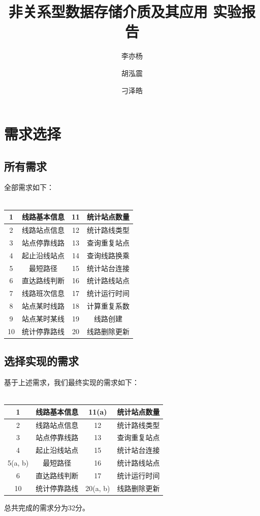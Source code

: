 \documentclass[11pt,a4paper]{article}
\title{非关系型数据存储介质及其应用 实验报告}
\author[]{李亦杨}
\affil[]{学号：10195101467}
\author[]{胡泓震}
\affil[]{学号：10195101485}
\author[]{刁泽皓}
\affil[]{学号：10195101470}
\date{}
\begin{document}

\maketitle

\newpage

\hypersetup{linkcolor=black}
\tableofcontents


\newpage
\section{需求选择}
\subsection{所有需求}
全部需求如下：\\
\\ 
\begin{center}
\centering
\begin{tabular}{| c | c | c | c |}
\hline
1 & 线路基本信息 & 11 & 统计站点数量 \\ \hline
2 & 线路站点信息 & 12 & 统计路线类型 \\ \hline
3 & 站点停靠线路 & 13 & 查询重复站点 \\ \hline
4 & 起止沿线站点 & 14 & 查询线路换乘 \\ \hline
5 & 最短路径 & 15 & 统计站台连接 \\ \hline
6 & 直达路线判断 & 16 & 统计路线站点 \\ \hline
7 & 线路班次信息 & 17 & 统计运行时间 \\ \hline
8 & 站点某时线路 & 18 & 计算重复系数 \\ \hline
9 & 站点某时某线 & 19 & 线路创建 \\ \hline
10 & 统计停靠路线 & 20 & 线路删除更新 \\ \hline
\end{tabular}
\end{center}

\subsection{选择实现的需求}
基于上述需求，我们最终实现的需求如下：\\
\\ 
\begin{center}
\centering
\begin{tabular}{| c | c | c | c |}
\hline
1 & 线路基本信息 &  11(a) & 统计站点数量 \\ \hline
2 & 线路站点信息 & 12 & 统计路线类型 \\ \hline
3 & 站点停靠线路 & 13 & 查询重复站点 \\ \hline
4 & 起止沿线站点 &  15 & 统计站台连接 \\ \hline
5(a, b) & 最短路径 &  16 & 统计路线站点 \\ \hline
6 & 直达路线判断 & 17 & 统计运行时间 \\ \hline
10 & 统计停靠路线 & 20(a, b) & 线路删除更新 \\ \hline
\end{tabular}
\end{center}
总共完成的需求分为32分。
\end{document}
